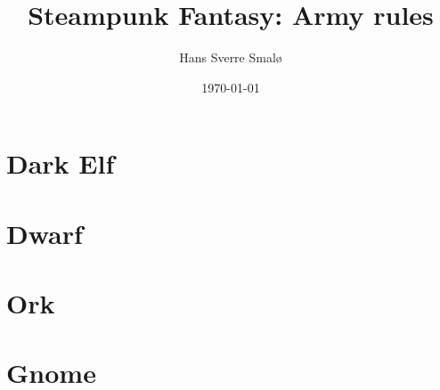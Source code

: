 \documentclass[a4,12pt, color, hyperref]{book}
\title{Steampunk Fantasy: Army rules}
\author{Hans Sverre Smalø}
\date{\today}
\begin{document}
\maketitle
\tableofcontents

\chapter{Dark Elf}
%


\chapter{Dwarf}


%

\chapter{Ork}



\chapter{Gnome}

\end{document}

